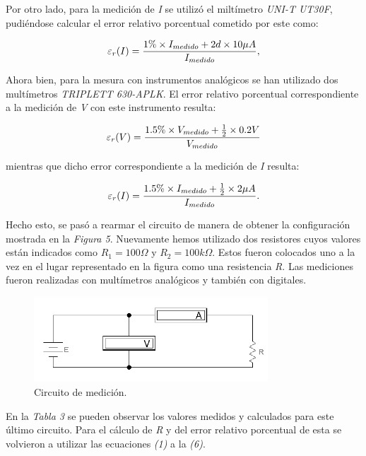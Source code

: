 \documentclass{article}
\begin{document}
	Por otro lado, para la medición de \textit{I} se utilizó el miltímetro \textit{UNI-T UT30F}, pudiéndose calcular el error relativo porcentual cometido por este como:
\medskip

\begin{equation}
 	\varepsilon_r(I) = {1\%\times I_{medido} + 2d\times10\mu A \over I_{medido}},
\end{equation}
\smallskip


	Ahora bien, para la mesura con instrumentos analógicos se han utilizado dos multímetros \textit{TRIPLETT 630-APLK}. El error relativo porcentual correspondiente a la medición de \textit{V} con este instrumento resulta:

\begin{equation}
 	\varepsilon_r(V) = {1.5\%\times V_{medido} + {1 \over 2}\times 0.2V \over V_{medido}}
\end{equation}
\smallskip	

\noindent mientras que dicho error correspondiente a la medición de \textit{I} resulta:

\begin{equation}
 	\varepsilon_r(I) = {1.5\%\times I_{medido} + {1 \over 2}\times 2\mu A \over I_{medido}}.
\end{equation}
\medskip



	Hecho esto, se pasó a rearmar el circuito de manera de obtener la configuración mostrada en la \textit{Figura 5}. Nuevamente hemos utilizado dos resistores cuyos valores están indicados como \textit{$R_1=100\Omega$} y \textit{$R_2=100k\Omega$}. Estos fueron colocados uno a la vez en el lugar representado en la figura como una resistencia \textit{R}. Las mediciones fueron realizadas con multímetros analógicos y también con digitales.
\bigskip

\begin{figure}[h]
	\centering
	\includegraphics[width=0.78\textwidth]{images/p2-item-b.jpg}
	\caption{Circuito de medición.}
\end{figure}
\bigskip\bigskip


\noindent En la \textit{Tabla 3} se pueden observar los valores medidos y calculados para este último circuito. Para el cálculo de \textit{R} y del error relativo porcentual de esta se volvieron a utilizar las ecuaciones \textit{(1)} a la \textit{(6)}.
\bigskip\medskip
\end{document}
